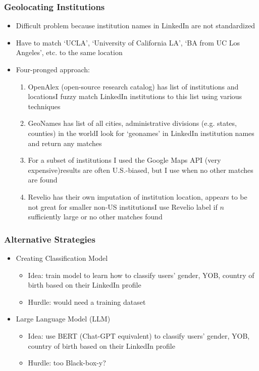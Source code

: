 \documentclass[xcolor=dvipsnames, compress, 12pt, aspectratio=169, handout]{beamer}
\begin{document}
\begin{frame}
    \frametitle{Geolocating Institutions}
    \begin{itemize}
        \item Difficult problem because institution names in LinkedIn are not standardized
        \item Have to match `UCLA', `University of California LA', `BA from UC Los Angeles', etc. to the same location 
        \item Four-pronged approach:
        \begin{enumerate}
            \item OpenAlex (open-source research catalog) has list of institutions and locations\textemdash I fuzzy match LinkedIn institutions to this list using various techniques 
            \item GeoNames has list of all cities, administrative divisions (e.g. states, counties) in the world\textemdash I look for `geonames' in LinkedIn institution names and return any matches 
            \item For a subset of institutions I used the Google Maps API (very expensive)\textemdash results are often U.S.-biased, but I use when no other matches are found 
            \item Revelio has their own imputation of institution location, appears to be not great for smaller non-US institutions\textemdash I use Revelio label if $n$ sufficiently large or no other matches found 
        \end{enumerate}
    \end{itemize}
\end{frame}

\begin{frame}
    \frametitle{Alternative Strategies}
    \begin{itemize}
        \item Creating Classification Model
        \begin{itemize}
            \item Idea: train model to learn how to classify users' gender, YOB, country of birth based on their LinkedIn profile
            \item Hurdle: would need a training dataset
        \end{itemize}
        \item Large Language Model (LLM) 
        \begin{itemize}
            \item Idea: use BERT (Chat-GPT equivalent) to classify users' gender, YOB, country of birth based on their LinkedIn profile
            \item Hurdle: too Black-box-y? 
        \end{itemize}
    \end{itemize}
\end{frame}
\end{document}
